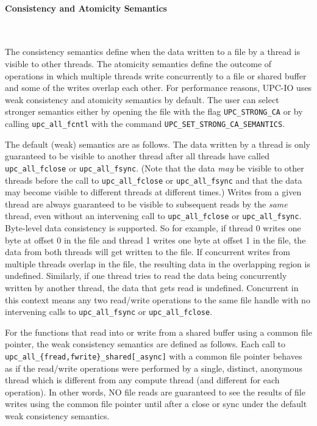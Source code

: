 \documentclass[12pt,titlepage]{article}
\newcounter{parnum}
\newcommand\np{\addtocounter{parnum}{1}\hspace{-2em}\makebox[2em][l]{\arabic{parnum}}}
\begin{document}
\paragraph{Consistency and Atomicity Semantics}\ \\

\np The consistency semantics define when the data written
to a file by a thread is visible to other threads. The atomicity semantics
define the outcome of operations in which multiple threads write
concurrently to a file or shared buffer and some of the writes overlap each other. For
performance reasons, UPC-IO uses weak consistency and
atomicity semantics by default. The user can select stronger semantics either by
opening the file with the flag {\tt UPC\_STRONG\_CA} or by calling 
{\tt upc\_all\_fcntl} with the command 
{\tt UPC\_SET\_STRONG\_CA\_SEMANTICS}.

\np The default (weak) semantics are as follows. The data written by a thread is
only guaranteed to be visible to another thread after all threads have
called {\tt upc\_all\_fclose} or {\tt upc\_all\_fsync}. (Note that the data \textit{%
may} be visible to other threads before the call to {\tt upc\_all\_fclose} or
{\tt upc\_all\_fsync} and that the data may become visible to different
threads at different times.) Writes from a given thread are always
guaranteed to be visible to subsequent reads by the \textit{same} thread,
even without an intervening call to {\tt upc\_all\_fclose} or {\tt upc\_all\_fsync}.
Byte-level data consistency is supported. So for example, if thread 0
writes one byte at offset 0 in the file and thread 1 writes one byte at
offset 1 in the file, the data from both threads will get written to the
file. If concurrent writes from multiple threads overlap in the file, the
resulting data in the overlapping region is undefined. Similarly, if one
thread tries to read the data being concurrently written by another thread,
the data that gets read is undefined. Concurrent in this context means any
two read/write operations to the same file handle with no intervening calls
to {\tt upc\_all\_fsync} or {\tt upc\_all\_fclose}.

\np For the functions that read into or write from a shared buffer using a
common file pointer, the weak consistency semantics are defined as follows.
Each call to {\tt upc\_all\_\{fread,fwrite\}\_shared[\_async]} with a common file
pointer behaves as if the read/write operations were performed by a single,
distinct, anonymous thread which is different from any compute thread (and
different for each operation). In other words, NO file reads are guaranteed to
see the results of file writes using the common file pointer until after a close
or sync under the default weak consistency semantics.
\end{document}
